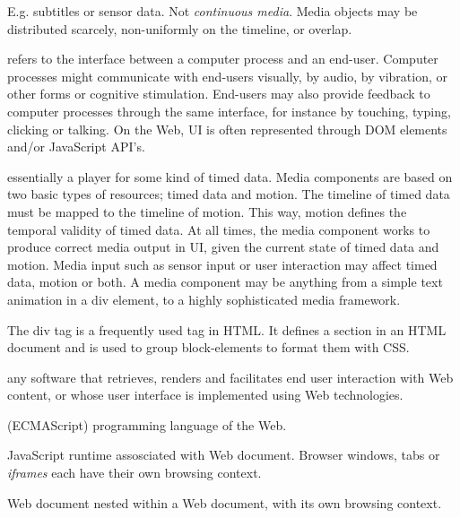 E.g. subtitles or sensor data. Not \emph{continuous media}.
Media objects may be distributed scarcely, non-uniformly on the
timeline, or overlap.


refers to the interface between a computer process and an end-user. Computer
processes might communicate with end-users visually, by audio, by vibration,
or other forms or cognitive stimulation. End-users may also provide feedback
to computer processes through the same interface, for instance by touching,
typing, clicking or talking. On the Web, UI is often represented through DOM
elements and/or JavaScript API’s.


essentially a player for some kind of timed data. Media components are based
on two basic types of resources; timed data and motion. The timeline of timed
data must be mapped to the timeline of motion. This way, motion defines the
temporal validity of timed data. At all times, the media component works to
produce correct media output in UI, given the current state of timed data and
motion. Media input such as sensor input or user interaction may affect timed
data, motion or both. A media component may be anything from a simple text
animation in a div element, to a highly sophisticated media framework.


The div tag is a frequently used tag in HTML. It defines a section in an
HTML document and is used to group block-elements to format them with CSS.


any software that retrieves, renders and facilitates end user interaction with
Web content, or whose user interface is implemented using Web technologies.


(ECMAScript) programming language of the Web. 


JavaScript runtime assosciated with Web document. Browser windows, tabs or
\emph{iframes} each have their own browsing context.


Web document nested within a Web document, with its own browsing context.
